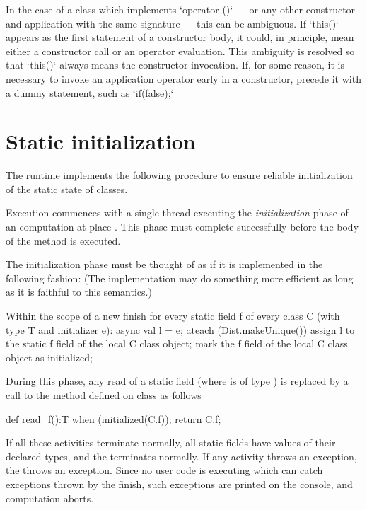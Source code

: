 In the case of a class which implements \xcd`operator ()` 
--- or any other constructor and application with the same signature --- 
this can be ambiguous.  If \xcd`this()` appears as the first statement of a
constructor body, it could, in principle, mean either a constructor call or an
operator evaluation.   This ambiguity is resolved so that \xcd`this()` always
means the constructor invocation.  If, for some reason, it is necessary to
invoke an application operator early in a constructor, precede it with a dummy
statement, such as \xcd`if(false);`  

\section{Static initialization}
\label{StaticInitialization}
The \Xten{} runtime implements the following procedure to ensure
reliable initialization of the static state of classes.


Execution commences with a single thread executing the
\emph{initialization} phase of an \Xten{} computation at place . This
phase must complete successfully before the body of the  method is
executed.

The initialization phase must be thought of as if it is implemented in
the following fashion: (The implementation may do something more
efficient as long as it is faithful to this semantics.)

\begin{xten}
Within the scope of a new finish
for every static field f of every class C 
   (with type T and initializer e):
async {
  val l = e; 
  ateach (Dist.makeUnique()) {
     assign l to the static f field of 
         the local C class object;
     mark the f field of the local C 
         class object as initialized;
  }
}
\end{xten}

During this phase, any read of a static field  (where  is of type )
is replaced by a call to the method  defined on class 
as follows

\begin{xten}
def read_f():T {
   when (initialized(C.f)){};
   return C.f;
}
\end{xten}
 

If all these activities terminate normally, all static fields have values of
their declared types, 
and the  terminates normally. If
any activity throws an exception, the  throws an
exception. Since no user code is executing which can catch exceptions
thrown by the finish, such exceptions are printed on the console, and
computation aborts.

